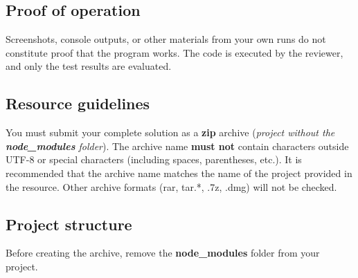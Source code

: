 \subsection*{Proof of operation}
Screenshots, console outputs, or other materials from your own runs do not constitute proof that the program works.
The code is executed by the reviewer, and only the test results are evaluated.

\subsection*{Resource guidelines}
You must submit your complete solution as a \textbf{zip} archive (\textit{project without the \textbf{node\_modules} folder}).
The archive name \textbf{must not} contain characters outside UTF-8 or special characters (including spaces, parentheses, etc.).
It is recommended that the archive name matches the name of the project provided in the resource.
Other archive formats (rar, tar.*, .7z, .dmg) will not be checked.

\subsection*{Project structure}
Before creating the archive, remove the \textbf{node\_modules} folder from your project.